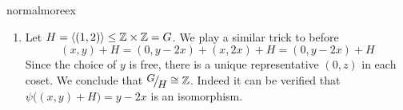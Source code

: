 \begin{examples}{}{normalmoreex}
\begin{enumerate}
	  \item\label{ex:hardgmodh} Let $H=\left\langle (1,2)\right\rangle\le\mathbb{Z}\times\mathbb{Z}=G$. We play a similar trick to before
	  \[
	  	(x,y)+H =(0,y-2x)+(x,2x)+H =(0,y-2x)+H
	  \]
	  Since the choice of $y$ is free, there is a unique representative $(0,z)$ in each coset. We conclude that $\quotient GH\cong\Z$. Indeed it can be verified that $\psi\bigl((x,y)+H\bigr)=y-2x$ is an isomorphism. 
	
		
		
	\end{enumerate}
\end{examples}


\clearpage


